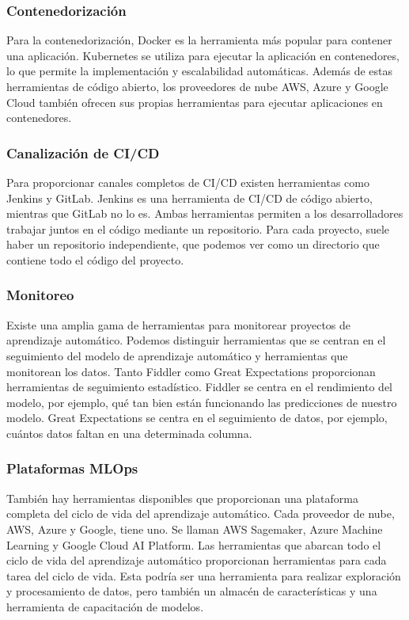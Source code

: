 \documentclass[10pt]{book}
\begin{document}
\subsubsection{Contenedorización}
Para la contenedorización, Docker es la herramienta más popular para contener una aplicación. Kubernetes se utiliza para ejecutar la aplicación en contenedores, lo que permite la implementación y escalabilidad automáticas. Además de estas herramientas de código abierto, los proveedores de nube AWS, Azure y Google Cloud también ofrecen sus propias herramientas para ejecutar aplicaciones en contenedores.

\subsubsection{Canalización de CI/CD}
Para proporcionar canales completos de CI/CD existen herramientas como Jenkins y GitLab. Jenkins es una herramienta de CI/CD de código abierto, mientras que GitLab no lo es. Ambas herramientas permiten a los desarrolladores trabajar juntos en el código mediante un repositorio. Para cada proyecto, suele haber un repositorio independiente, que podemos ver como un directorio que contiene todo el código del proyecto.

\subsubsection{Monitoreo}
Existe una amplia gama de herramientas para monitorear proyectos de aprendizaje automático. Podemos distinguir herramientas que se centran en el seguimiento del modelo de aprendizaje automático y herramientas que monitorean los datos. Tanto Fiddler como Great Expectations proporcionan herramientas de seguimiento estadístico. Fiddler se centra en el rendimiento del modelo, por ejemplo, qué tan bien están funcionando las predicciones de nuestro modelo. Great Expectations se centra en el seguimiento de datos, por ejemplo, cuántos datos faltan en una determinada columna.

\subsubsection{Plataformas MLOps}
También hay herramientas disponibles que proporcionan una plataforma completa del ciclo de vida del aprendizaje automático. Cada proveedor de nube, AWS, Azure y Google, tiene uno. Se llaman AWS Sagemaker, Azure Machine Learning y Google Cloud AI Platform. Las herramientas que abarcan todo el ciclo de vida del aprendizaje automático proporcionan herramientas para cada tarea del ciclo de vida. Esta podría ser una herramienta para realizar exploración y procesamiento de datos, pero también un almacén de características y una herramienta de capacitación de modelos.
\end{document}
